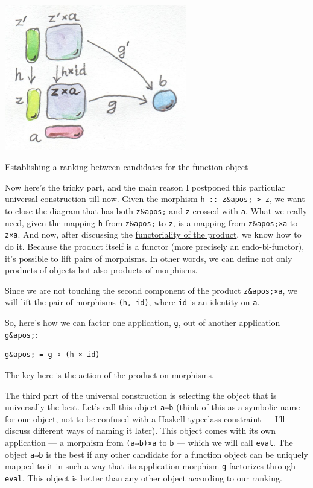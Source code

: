 \hypertarget{attachment_4245}{}
\includegraphics[width=3.12500in]{images/functionranking.jpg}

Establishing a ranking between candidates for the function object

Now here's the tricky part, and the main reason I postponed this
particular universal construction till now. Given the morphism
\texttt{h\ ::\ z\&apos;-\textgreater{}\ z}, we want to close the diagram
that has both \texttt{z\&apos;} and \texttt{z} crossed with \texttt{a}.
What we really need, given the mapping \texttt{h} from \texttt{z\&apos;}
to \texttt{z}, is a mapping from \texttt{z\&apos;×a} to \texttt{z×a}.
And now, after discussing the
\href{https://bartoszmilewski.com/2015/02/03/functoriality/}{functoriality
of the product}, we know how to do it. Because the product itself is a
functor (more precisely an endo-bi-functor), it's possible to lift pairs
of morphisms. In other words, we can define not only products of objects
but also products of morphisms.

Since we are not touching the second component of the product
\texttt{z\&apos;×a}, we will lift the pair of morphisms
\texttt{(h,\ id)}, where \texttt{id} is an identity on \texttt{a}.

So, here's how we can factor one application, \texttt{g}, out of another
application \texttt{g\&apos;}:

\begin{verbatim}
g&apos; = g ∘ (h × id)
\end{verbatim}

The key here is the action of the product on morphisms.

The third part of the universal construction is selecting the object
that is universally the best. Let's call this object \texttt{a⇒b} (think
of this as a symbolic name for one object, not to be confused with a
Haskell typeclass constraint --- I'll discuss different ways of naming
it later). This object comes with its own application --- a morphism
from \texttt{(a⇒b)×a} to \texttt{b} --- which we will call
\texttt{eval}. The object \texttt{a⇒b} is the best if any other
candidate for a function object can be uniquely mapped to it in such a
way that its application morphism \texttt{g} factorizes through
\texttt{eval}. This object is better than any other object according to
our ranking.

